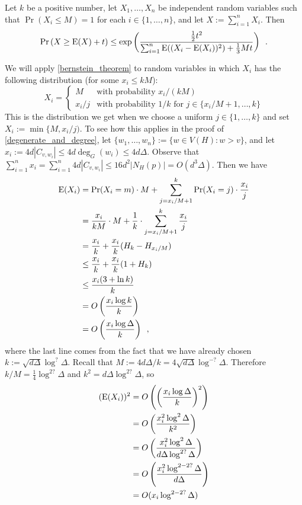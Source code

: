 \documentclass{patmorin}
\begin{document}
\begin{thm}\label{bernstein_theorem}
  Let $k$ be a positive number, let $X_1,\ldots,X_n$ be independent random variables such that $\Pr(X_i\le M)=1$ for each $i\in\{1,\ldots,n\}$, and let $X:=\sum_{i=1}^n X_i$. Then
  \begin{equation}
    \Pr\left(X \ge \mathrm{E}(X)+ t\right)
      \le \exp\left(\frac{\tfrac{1}{2}t^2}{\sum_{i=1}^n \mathrm{E}((X_i-\mathrm{E}(X_i))^2)+\tfrac{1}{3}Mt}\right) \enspace . \label{bernstein}
  \end{equation}
\end{thm}
We will apply \cref{bernstein_theorem} to random variables in which $X_i$ has the following distribution (for some $x_i\le kM$):
\[
  X_i = \begin{cases}
          M & \text{with probability $x_i/(kM)$} \\
          x_i/j & \text{with probability $1/k$ for $j\in\{x_i/M+1,\ldots,k\}$}
        \end{cases}
\]
This is the distribution we get when we choose a uniform $j\in\{1,\ldots,k\}$ and set $X_i:=\min\{M,x_i/j)$.  To see how this applies in the proof of \cref{degenerate_and_degree}, let $\{w_1,\ldots,w_n\}:=\{w\in V(H):w>v\}$, and let $x_i:=4d|C_{v,w_i}|\le 4d\deg_G(w_i)\le 4d\Delta$.  Observe that $\sum_{i=1}^n x_i = \sum_{i=1}^n 4d|C_{v,w_i}|\le 16d^2|N_H(p)|=O(d^3\Delta)$.  
Then we have
\begin{align*}
  \mathrm{E}(X_i)
  & =\Pr(X_i=m)\cdot M + \sum_{j=x_i/M+1}^k \Pr(X_i=j)\cdot\frac{x_i}{j} \\
  & =\frac{x_i}{kM}\cdot M + \frac{1}{k}\cdot\sum_{j=x_i/M+1}^k \frac{x_i}{j} \\
  & = \frac{x_i}{k} + \frac{x_i}{k}(H_{k}-H_{x_i/M}) \\
  & \le \frac{x_i}{k} + \frac{x_i}{k}(1+H_{k}) \\
  & \le \frac{x_i(3+\ln k)}{k} \\
  & = O\left(\frac{x_i\log k}{k}\right) \\
  & = O\left(\frac{x_i\log \Delta}{k}\right)
  \enspace ,
\end{align*}
where the last line comes from the fact that we have already chosen $k:=\sqrt{d\Delta}\log^{?}\Delta$.  Recall that $M:=4d\Delta/k=4\sqrt{d\Delta}\log^{-?}\Delta$.  Therefore $k/M=\tfrac{1}{4}\log^{2?}\Delta$ and $k^2=d\Delta\log^{2?}\Delta$, so
\begin{align*}
  (\mathrm{E}(X_i))^2
  & = O\left(\left(\frac{x_i\log \Delta}{k}\right)^2\right) \\
  & = O\left(\frac{x_i^2\log^2 \Delta}{k^2}\right) \\
  & = O\left(\frac{x_i^2\log^2 \Delta}{d\Delta\log^{2?}\Delta}\right) \\
  & = O\left(\frac{x_i^2\log^{2-2?} \Delta}{d\Delta}\right) \\
  & = O(x_i\log^{2-2?} \Delta)
\end{align*}
\end{document}
